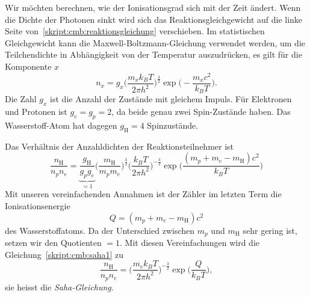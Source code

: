 Wir möchten berechnen, wie der Ionisationsgrad sich mit der Zeit ändert.
Wenn die Dichte der Photonen sinkt wird sich das Reaktionsgleichgewicht
auf die linke Seite von~\eqref{skript:cmb:reaktionsgleichung} verschieben.
Im statistischen Gleichgewicht kann die Maxwell-Boltzmann-Gleichung
verwendet werden, um die Teilchendichte in Abhängigkeit von der Temperatur
auszudrücken, es gilt für die Komponente $x$
\[
n_x
=
g_x \biggl(\frac{m_xk_BT}{2\pi h^2}\biggr)^{\frac32}
\exp\biggl(-\frac{m_xc^2}{k_BT}\biggr).
\]
Die Zahl $g_x$ ist die Anzahl der Zustände mit gleichem Impuls.
Für Elektronen und Protonen ist $g_e=g_p=2$, da beide genau zwei
Spin-Zustände haben.
Das Wasserstoff-Atom hat dagegen $g_\text{H}=4$ Spinzustände.

Das Verhältnis der Anzahldichten der Reaktionsteilnehmer ist
\begin{equation}
\frac{n_\text{H}}{n_pn_e}
=
\underbrace{\frac{g_\text{H}}{g_pg_e}}_{\displaystyle=1}
\biggl(\frac{m_\text{H}}{m_pm_e}\biggr)^{\frac32}
\biggl(\frac{k_BT}{2\pi h^2}\biggr)^{-\frac32}
\exp\biggl( \frac{(m_p+m_e-m_\text{H})c^2}{k_BT} \biggr)
\label{skript:cmb:saha1}
\end{equation}
Mit unseren vereinfachenden Annahmen ist der Zähler im letzten Term
die Ionisationsenergie
\[
Q=(m_p+m_e-m_\text{H})c^2
\]
des Wasserstoffatoms.
Da der Unterschied zwischen $m_p$ und $m_\text{H}$ sehr gering ist,
setzen wir den Quotienten $=1$.
Mit diesen Vereinfachungen wird die Gleichung~\eqref{skript:cmb:saha1}
zu
\begin{equation}
\frac{n_\text{H}}{n_pn_e}
=
\biggl(\frac{m_ek_BT}{2\pi h^2}\biggr)^{-\frac32}
\exp\biggl( \frac{Q}{k_BT} \biggr),
\label{skript:cmb:saha}
\end{equation}
sie heisst die {\em Saha-Gleichung}.

